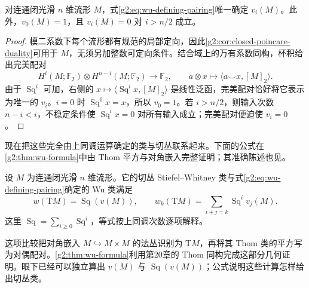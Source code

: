\begin{proposition}\label{g2:prop:wu-existence-vanishing}
	对连通闭光滑 \(n\) 维流形 \(M\)，式\eqref{g2:eq:wu-defining-pairing}唯一确定 \(v_i(M)\)。此外，\(v_0(M)=1\)，且 \(v_i(M)=0\) 对 \(i>n/2\) 成立。
\end{proposition}
\begin{proof}
	模二系数下每个流形都有规范的局部定向，因此\cref{g2:cor:closed-poincare-duality}可用于 \(M\)，无须另加整数可定向条件。结合域上的万有系数同构，杯积给出完美配对
	\[
		H^i(M;\mathbb F_2)\otimes H^{n-i}(M;\mathbb F_2)\longrightarrow\mathbb F_2,
		\qquad a\otimes x\longmapsto\langle a\smile x,[M]_2\rangle.
	\]
	由于 \(\operatorname{Sq}^i\) 可加，右侧的 \(x\mapsto\langle\operatorname{Sq}^i x,[M]_2\rangle\) 是线性泛函，完美配对恰好将它表示为唯一的 \(v_i\)。\(i=0\) 时 \(\operatorname{Sq}^0x=x\)，所以 \(v_0=1\)。若 \(i>n/2\)，则输入次数 \(n-i<i\)，不稳定条件使 \(\operatorname{Sq}^i x=0\) 对所有输入成立；完美配对便迫使 \(v_i=0\)。
\end{proof}

现在把这些完全由上同调运算确定的类与切丛联系起来。下面的公式在\cref{g2:thm:wu-formula}中由 Thom 平方与对角嵌入完整证明；其准确陈述也见\cite[第23章第3节]{May1999}。

\begin{theorem}[Wu 公式]\label{g2:thm:wu-tangent-preview}
	设 \(M\) 为连通闭光滑 \(n\) 维流形。它的切丛 Stiefel--Whitney 类与式\eqref{g2:eq:wu-defining-pairing}确定的 Wu 类满足
	\begin{equation}\label{g2:eq:wu-tangent-formula}
		w(\mathrm TM)=\operatorname{Sq}(v(M)),\qquad
		w_k(\mathrm TM)=\sum_{i+j=k}\operatorname{Sq}^i v_j(M).
	\end{equation}
	这里 \(\operatorname{Sq}=\sum_{i\ge0}\operatorname{Sq}^i\)，等式按上同调次数逐项解释。
\end{theorem}

这项比较把对角嵌入 \(M\hookrightarrow M\times M\) 的法丛识别为 \(\mathrm TM\)，再将其 Thom 类的平方写为对偶配对。\cref{g2:thm:wu-formula}利用第20章的 Thom 同构完成这部分几何证明。眼下已经可以独立算出 \(v(M)\) 与 \(\operatorname{Sq}(v(M))\)；公式说明这些计算怎样给出切丛类。

